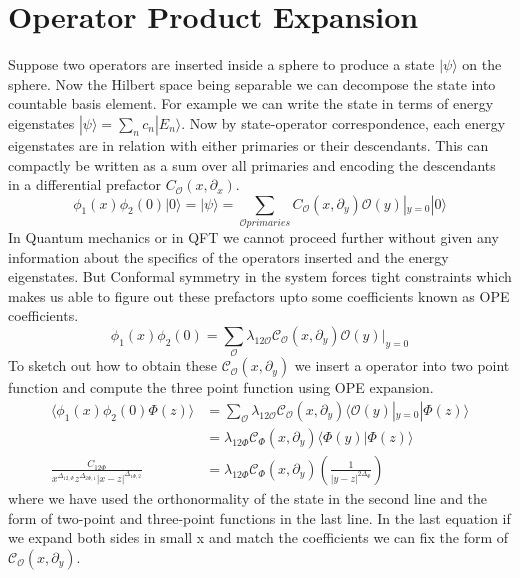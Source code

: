 \documentclass[12pt,a4paper,oneside]{book}
\theoremstyle{definition}
\begin{document}
    \section{Operator Product Expansion}
    Suppose two operators are inserted inside a sphere to produce a state $|\psi\rangle$ on the sphere. Now the Hilbert space being separable we can decompose the state into countable basis element. For example we can write the state in terms of energy eigenstates $|\psi\rangle = \sum_{n}c_{n}|E_{n}\rangle$. Now by state-operator correspondence, each energy eigenstates are in relation with either primaries or their descendants. This can compactly be written as a sum over all primaries and encoding the descendants in a differential prefactor $C_{\mathcal{O}}(x,\partial_x)$.
    \begin{equation}
        \phi_1(x)\phi_2(0)|0\rangle = |\psi\rangle = \sum_{\mathcal{O} primaries} C_{\mathcal{O}}(x,\partial_y)\mathcal{O}(y)|_{y=0}|0\rangle
    \end{equation}  
    In Quantum mechanics or in QFT we cannot proceed further without given any information about the specifics of the operators inserted and the energy eigenstates. But Conformal symmetry in the system forces tight constraints which makes us able to figure out these prefactors upto some coefficients known as OPE coefficients. 
    \begin{equation}
        \phi_1(x)\phi_2(0) = \sum_{\mathcal{O}} \lambda_{12\mathcal{O}}\mathcal{C}_{\mathcal{O}}(x,\partial_y)\mathcal{O}(y)|_{y=0}
    \end{equation}
    To sketch out how to obtain these $\mathcal{C}_{\mathcal{O}}(x,\partial_y)$ we insert a operator into two point function and compute the three point function using OPE expansion.
    \begin{align}
        \langle\phi_1(x)\phi_2(0)\Phi(z)\rangle &= \sum_{\mathcal{O}} \lambda_{12\mathcal{O}}\mathcal{C}_{\mathcal{O}}(x,\partial_y)\langle\mathcal{O}(y)|_{y=0}|\Phi(z)\rangle\\
        &= \lambda_{12\Phi}\mathcal{C}_{\Phi}(x,\partial_y)\langle\Phi(y)|\Phi(z)\rangle\\
        \frac{C_{12\Phi}}{x^{\Delta_{12,\Phi}}z^{\Delta_{2\Phi,1}}|x-z|^{\Delta_{1\Phi,2}}} &= \lambda_{12\Phi}\mathcal{C}_{\Phi}(x,\partial_y) \left(\frac{1}{|y-z|^{2\Delta_{\Phi}}}\right)
    \end{align}
    where we have used the orthonormality of the state in the second line and the form of two-point and three-point functions in the last line. In the last equation if we expand both sides in small x and match the coefficients we can fix the form of $\mathcal{C}_{\mathcal{O}}(x,\partial_y)$.
\end{document}
